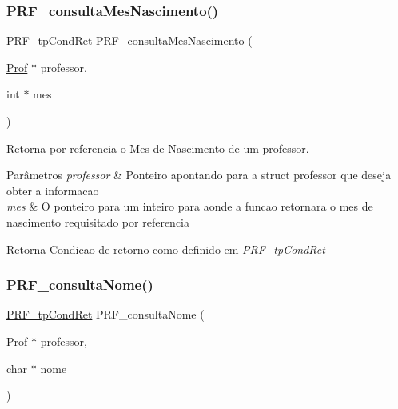 \subsubsection{\texorpdfstring{P\+R\+F\+\_\+consulta\+Mes\+Nascimento()}{PRF\_consultaMesNascimento()}}
{\footnotesize\ttfamily \hyperlink{group__modulo_professor_ga777e215896d573d2e99d98793b1f0ed1}{P\+R\+F\+\_\+tp\+Cond\+Ret} P\+R\+F\+\_\+consulta\+Mes\+Nascimento (\begin{DoxyParamCaption}\item[{\hyperlink{structprof}{Prof} $\ast$}]{professor,  }\item[{int $\ast$}]{mes }\end{DoxyParamCaption})}



Retorna por referencia o Mes de Nascimento de um professor. 


\begin{DoxyParams}{Parâmetros}
{\em professor} & Ponteiro apontando para a struct professor que deseja obter a informacao \\
\hline
{\em mes} & O ponteiro para um inteiro para aonde a funcao retornara o mes de nascimento requisitado por referencia \\
\hline
\end{DoxyParams}
\begin{DoxyReturn}{Retorna}
Condicao de retorno como definido em {\itshape P\+R\+F\+\_\+tp\+Cond\+Ret} 
\end{DoxyReturn}
\mbox{\label{group__funcoes_consulta_ga30908e7603542d06c05f14208498fd3d}} 
\subsubsection{\texorpdfstring{P\+R\+F\+\_\+consulta\+Nome()}{PRF\_consultaNome()}}
{\footnotesize\ttfamily \hyperlink{group__modulo_professor_ga777e215896d573d2e99d98793b1f0ed1}{P\+R\+F\+\_\+tp\+Cond\+Ret} P\+R\+F\+\_\+consulta\+Nome (\begin{DoxyParamCaption}\item[{\hyperlink{structprof}{Prof} $\ast$}]{professor,  }\item[{char $\ast$}]{nome }\end{DoxyParamCaption})}



